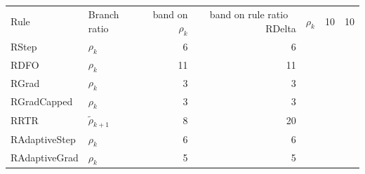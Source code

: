 \begin{tabular}{@{}llrr@{}}
\toprule
Rule & Branch ratio & band on $\rho_k$ & band on rule ratio \
\midrule
RDelta & $\rho_k$ & 10 & 10 \\
RStep & $\rho_k$ & 6 & 6 \\
RDFO & $\rho_k$ & 11 & 11 \\
RGrad & $\rho_k$ & 3 & 3 \\
RGradCapped & $\rho_k$ & 3 & 3 \\
RRTR & $\widetilde\rho_{k+1}$ & 8 & 20 \\
RAdaptiveStep & $\rho_k$ & 6 & 6 \\
RAdaptiveGrad & $\rho_k$ & 5 & 5 \\
\bottomrule
\end{tabular}

